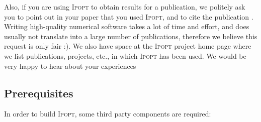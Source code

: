 \documentclass[10pt]{article}
\newcommand{\Ipopt}{\textsc{Ipopt}\xspace}
\begin{document}
Also, if you are using \Ipopt to obtain results for a publication, we
politely ask you to point out in your paper that you used \Ipopt, and
to cite the publication \cite{WaecBieg06:mp}.  Writing high-quality
numerical software takes a lot of time and effort, and does usually
not translate into a large number of publications, therefore we
believe this request is only fair :).  We also have space at the
\Ipopt project home page where we list publications, projects, etc.,
in which \Ipopt has been used.  We would be very happy to hear about
your experiences

\subsection{Prerequisites}\label{sec:prerequisites}
In order to build \Ipopt, some third party components are required:
\end{document}
